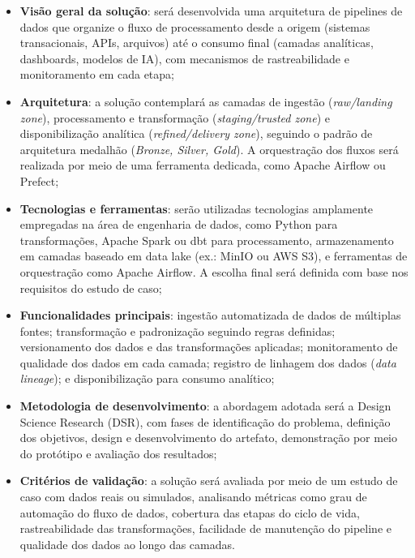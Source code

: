 \documentclass[
    12pt,                %
    openright,           %
    oneside,             %
    a4paper,             %
    english,             %
    brazil               %
]{abntex2}
\begin{document}
\begin{itemize}
    \item \textbf{Visão geral da solução}: será desenvolvida uma arquitetura de pipelines de dados que organize o fluxo de processamento desde a origem (sistemas transacionais, APIs, arquivos) até o consumo final (camadas analíticas, dashboards, modelos de IA), com mecanismos de rastreabilidade e monitoramento em cada etapa;

    \item \textbf{Arquitetura}: a solução contemplará as camadas de ingestão (\textit{raw/landing zone}), processamento e transformação (\textit{staging/trusted zone}) e disponibilização analítica (\textit{refined/delivery zone}), seguindo o padrão de arquitetura medalhão (\textit{Bronze, Silver, Gold}). A orquestração dos fluxos será realizada por meio de uma ferramenta dedicada, como Apache Airflow ou Prefect;

    \item \textbf{Tecnologias e ferramentas}: serão utilizadas tecnologias amplamente empregadas na área de engenharia de dados, como Python para transformações, Apache Spark ou dbt para processamento, armazenamento em camadas baseado em data lake (ex.: MinIO ou AWS S3), e ferramentas de orquestração como Apache Airflow. A escolha final será definida com base nos requisitos do estudo de caso;

    \item \textbf{Funcionalidades principais}: ingestão automatizada de dados de múltiplas fontes; transformação e padronização seguindo regras definidas; versionamento dos dados e das transformações aplicadas; monitoramento de qualidade dos dados em cada camada; registro de linhagem dos dados (\textit{data lineage}); e disponibilização para consumo analítico;

    \item \textbf{Metodologia de desenvolvimento}: a abordagem adotada será a Design Science Research (DSR), com fases de identificação do problema, definição dos objetivos, design e desenvolvimento do artefato, demonstração por meio do protótipo e avaliação dos resultados;

    \item \textbf{Critérios de validação}: a solução será avaliada por meio de um estudo de caso com dados reais ou simulados, analisando métricas como grau de automação do fluxo de dados, cobertura das etapas do ciclo de vida, rastreabilidade das transformações, facilidade de manutenção do pipeline e qualidade dos dados ao longo das camadas.
\end{itemize}
\end{document}

